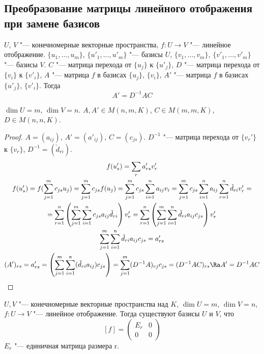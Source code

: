 \subsection{Преобразование матрицы линейного отображения при замене базисов}

\begin{theorem}
	$U$, $V$ "--- конечномерные векторные пространства, $f\colon U \to V$ "--- линейное отображение.
	$\{u_1, \dots, u_m\}$, $\{u'_1, \dots, u'_m\}$  "--- базисы $U$,
	$\{v_1, \dots, v_m\}$, $\{v'_1, \dots, v'_m\}$  "--- базисы $V$.
	$C$ "--- матрица перехода от $\{u_j\}$ к $\{u'_j\}$,
	$D$ "--- матрица перехода от $\{v_i\}$ к $\{v'_i\}$,
	$A$ "--- матрица $f$ в базисах $\{u_j\}$, $\{v_i\}$,
	$A'$ "--- матрица $f$ в базисах $\{u'_j\}$, $\{v'_i\}$.
	Тогда
	\[ A' = D^{-1}AC \]
\end{theorem}
\begin{Rem}
	$\dim U = m$, $\dim V = n$.
	$A, A' \in M(n, m, K)$,
	$C \in M(m, m, K)$,
	$D \in M(n, n, K)$.
\end{Rem}
\begin{proof}
	$A = (a_{ij})$, $A'=(a'_{ij})$, $C = (c_{js})$.
	$D^{-1}$ "--- матрица перехода от $\{v_r'\}$ к $\{v_r\}$, $D^{-1}=(\check d_{ri})$.
	\begin{gather*}
		f(u'_s) = \sum_ra'_{rs}v'_r \\
		f(u'_s) = f(\sum_{j=1}^m c_{js}u_j) = \sum_{j=1}^m c_{js}f(u_j)
			= \sum_{j=1}^m c_{js} \sum_{i=1}^n a_{ij}v_i = \sum_{j=1}^m c_{js}\sum_{i=1}^n a_{ij} \sum_{r=1}^n\check d_{ri} v_r' = \\
		= \sum_{r=1}^n \left(\sum_{j=1}^m \sum_{i=1}^n c_{js}a_{ij}\check d_{ri}\right) v_r'
			= \sum_{r=1}^n \left(\sum_{j=1}^m \sum_{i=1}^n \check d_{ri}a_{ij}c_{js}\right)v_r' \\
		\sum_{j=1}^m \sum_{i=1}^n \check d_{ri}a_{ij} c_{js} = a'_{rs} \\
		(A')_{rs} = a'_{rs} = \left(\sum_{j=1}^m \sum_{i=1}^n (\check d_{ri}a_{ij})c_{js}\right)
			= \sum_{j = 1}^m(D^{-1}A)_{rj}c_{js} = (D^{-1}AC)_{rs} \Ra A' = D^{-1}AC
	\end{gather*}
\end{proof}

\begin{theorem}
	$U, V$ "--- конечномерные векторные пространства над $K$, $\dim U = m$, $\dim V = n$,
	$f\colon U \to V$ "--- линейное отображение.
	Тогда существуют базисы $U$ и $V$, что
	\[
		[f] = \begin{pmatrix}
			E_r & 0 \\
			0   & 0
		\end{pmatrix}
	\]
	$E_r$ "--- единичная матрица размера r.
\end{theorem}

